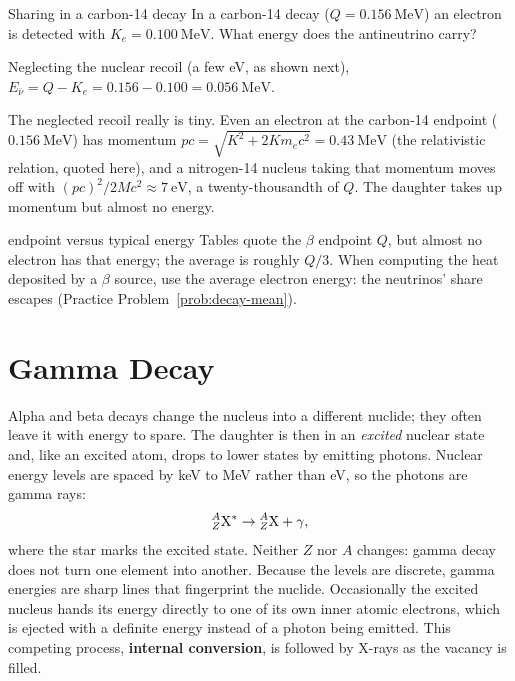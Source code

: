 \begin{exbox}{Sharing in a carbon-14 decay}\label{ex:decay-c14share}
In a carbon-14 decay ($Q=\SI{0.156}{\MeV}$) an electron is detected with $K_e=\SI{0.100}{\MeV}$. What
energy does the antineutrino carry?

Neglecting the nuclear recoil (a few eV, as shown next), $E_{\bar\nu}=Q-K_e=0.156-0.100=\SI{0.056}{\MeV}$.
\end{exbox}

The neglected recoil really is tiny. Even an electron at the carbon-14 endpoint ($\SI{0.156}{\MeV}$) has
momentum $pc=\sqrt{K^2+2Km_ec^2}=\SI{0.43}{\MeV}$ (the relativistic relation, quoted here), and a
nitrogen-14 nucleus taking that momentum moves off with $(pc)^2/2Mc^2\approx\SI{7}{\eV}$, a
twenty-thousandth of $Q$. The daughter takes up momentum but almost no energy.

\begin{figure}[htbp]
\centering
{}
\end{figure}


\begin{trapbox}{endpoint versus typical energy}
Tables quote the $\beta$ endpoint $Q$, but almost no electron has that energy; the average is roughly
$Q/3$. When computing the heat deposited by a $\beta$ source, use the average electron energy: the
neutrinos' share escapes (Practice Problem~\ref{prob:decay-mean}).
\end{trapbox}

\section{Gamma Decay}\label{sec:decay-gamma}

Alpha and beta decays change the nucleus into a different nuclide; they often leave it with energy to
spare. The daughter is then in an \emph{excited} nuclear state and, like an excited atom, drops to lower
states by emitting photons. Nuclear energy levels are spaced by keV to MeV rather than eV, so the photons
are gamma rays:
\[
\prescript{A}{Z}{\mathrm{X}}^{*}\to\prescript{A}{Z}{\mathrm{X}}+\gamma ,
\]
where the star marks the excited state. Neither $Z$ nor $A$ changes: gamma decay does not turn one element
into another. Because the levels are discrete, gamma energies are sharp lines that fingerprint the
nuclide. Occasionally the excited nucleus hands its energy directly to one of its own inner atomic
electrons, which is ejected with a definite energy instead of a photon being emitted. This competing
process, \textbf{internal conversion}, is followed by X-rays as the vacancy is filled.

